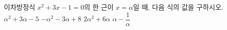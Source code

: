 이차방정식 $x^2+3x-1=0$의 한 근이 $x=\alpha$일 때, 다음 식의 값을 구하시오.
 $\alpha^2+3\alpha-5$
 $-\alpha^2-3\alpha+8$
 $2\alpha^2+6\alpha$
 $\alpha-\dfrac{1}{\alpha}$

